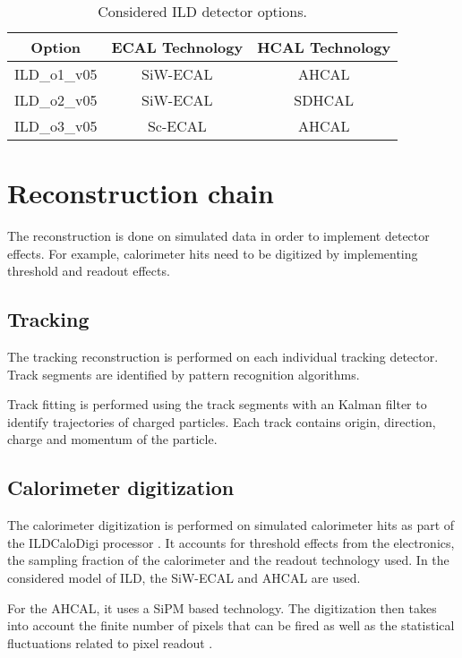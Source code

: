 \begin{table}[htb!]
  \centering
  \caption{Considered ILD detector options.} \label{table:ILDOptions}
  \begin{tabular}{|c|c|c|}
    \hline
    Option & ECAL Technology & HCAL Technology \\
    \hline
    ILD\_o1\_v05 & SiW-ECAL & AHCAL \\
    ILD\_o2\_v05 & SiW-ECAL & SDHCAL \\
    ILD\_o3\_v05 & Sc-ECAL & AHCAL \\
    \hline
  \end{tabular}
\end{table}

\section{Reconstruction chain}
\label{sec:recochain}

The reconstruction is done on simulated data in order to implement detector effects. For example, calorimeter hits need to be digitized by implementing threshold and readout effects.

\subsection{Tracking}

The tracking reconstruction is performed on each individual tracking detector. Track segments are identified by pattern recognition algorithms.

Track fitting is performed using the track segments with an Kalman filter \cite{Li2013, Fruhwirth:1987fm} to identify trajectories of charged particles. Each track contains origin, direction, charge and momentum of the particle.

\subsection{Calorimeter digitization}
\label{subsec:ILDDigiCalo}

The calorimeter digitization is performed on simulated calorimeter hits as part of the ILDCaloDigi processor \cite{Jeans2015}. It accounts for threshold effects from the electronics, the sampling fraction of the calorimeter and the readout technology used. In the considered model of ILD, the SiW-ECAL and AHCAL are used.

For the AHCAL, it uses a SiPM based technology. The digitization then takes into account the finite number of pixels that can be fired as well as the statistical fluctuations related to pixel readout \cite{Hartbrich:2016bbz}.

